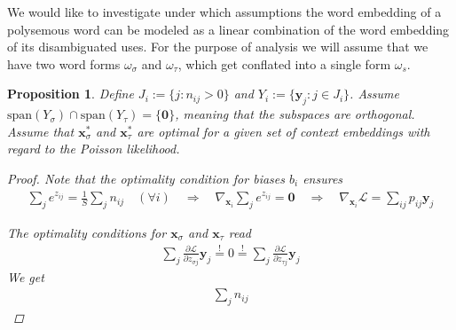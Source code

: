 \documentclass{article}
\renewcommand{\Re}{{\mathbb R}}
\newcommand{\logl}{{\mathcal L}}
\newcommand{\x}{{\mathbf x}}
\newcommand{\y}{{\mathbf y}}
\newcommand{\word}{{\omega}}
\newtheorem{proposition}{Proposition}
\begin{document}
We would like to investigate under which assumptions the word embedding of a polysemous word can be modeled as a linear combination of the word embedding of its disambiguated uses. For the purpose of analysis we will assume that we have two word forms $\word_\sigma$ and $\word_\tau$, which get conflated into a single form $\word_s$. 
\begin{proposition}
Define $J_i := \{ j: n_{ij} >0\}$ and $Y_i := \{ \y_j: j \in J_i\}$. Assume $\text{span}(Y_\sigma) \cap \text{span}(Y_\tau) = \{ \mathbf 0 \}$, meaning that the subspaces are orthogonal. Assume that $\x^*_\sigma$ and $\x^*_\tau$ are optimal for a given set of context embeddings with regard to the Poisson likelihood. 
\begin{proof}
Note that the optimality condition for biases $b_i$ ensures 
\begin{align}
\sum_j e^{z_{ij}} = \frac 1S \sum_j n_{ij}  \quad (\forall i) 
\quad    \Longrightarrow  \quad 
\nabla_{\x_i} \sum_j e^{z_{ij}} = \mathbf 0 
\quad    \Longrightarrow  \quad 
\nabla_{\x_i} \logl = \sum_{ij} p_{ij} \y_j 
\end{align}

\newpage

The optimality conditions for $\x_\sigma$ and $\x_\tau$ read
\begin{align}
\sum_{j} \frac{\partial \logl}{\partial z_{\sigma j}} \y_j \stackrel !=0 \stackrel != 
\sum_{j} \frac{\partial \logl}{\partial z_{\tau j}} \y_j
\end{align}
We get 
\begin{align}
\sum_{j} n_{ij} 
\end{align}
\end{proof}
\end{proposition} 



\end{document}
